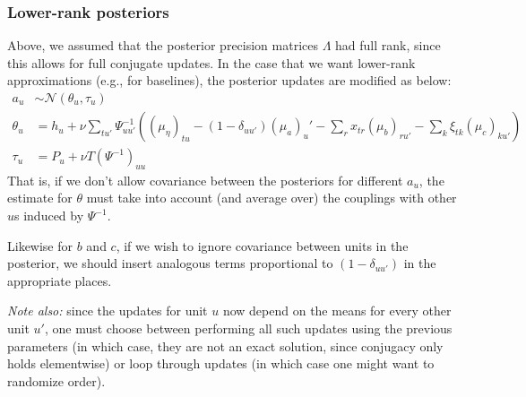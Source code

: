 \documentclass[11pt]{article}
\begin{document}
\subsubsection{Lower-rank posteriors}
Above, we assumed that the posterior precision matrices $\Lambda$ had full rank, since this allows for full conjugate updates. In the case that we want lower-rank approximations (e.g., for baselines), the posterior updates are modified as below:
\begin{align}
    a_u &\sim \mathcal{N}(\theta_u, \tau_u) \\
    \theta_u &= h_u + \nu \sum_{tu'} \Psi^{-1}_{uu'} \left(
        (\mu_\eta)_{tu}
        - (1 - \delta_{uu'})(\mu_a)_u'
        - \sum_r x_{tr} (\mu_b)_{ru'}
        - \sum_k \xi_{tk} (\mu_c)_{ku'}
    \right) \\
    \tau_{u} &= P_{u} + \nu T (\Psi^{-1})_{uu}
\end{align}
That is, if we don't allow covariance between the posteriors for different $a_u$, the estimate for $\theta$ must take into account (and average over) the couplings with other $u$s induced by $\Psi^{-1}$.

Likewise for $b$ and $c$, if we wish to ignore covariance between units in the posterior, we should insert analogous terms proportional to $(1 - \delta_{uu'})$ in the appropriate places.

\emph{Note also:} since the updates for unit $u$ now depend on the means for every other unit $u'$, one must choose between performing all such updates using the previous parameters (in which case, they are not an exact solution, since conjugacy only holds elementwise) or loop through updates (in which case one might want to randomize order).
\end{document}
